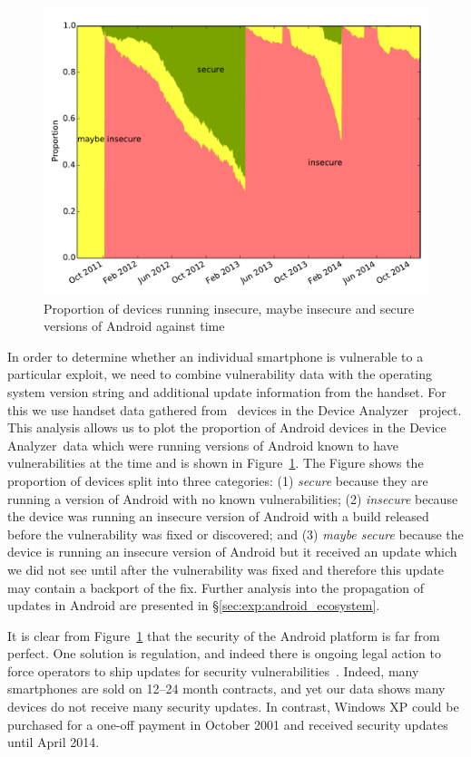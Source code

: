 \documentclass[conference,a4paper,twoside]{IEEEtran}
\let\OldTodo\todo
\renewcommand{\todo}{\OldTodo[inline]}
\newcommand{\todolater}[1]{}%
\newcommand{\da}{Device Analyzer}
\begin{document}
\begin{figure}[h]
\centering
\includegraphics[width=\columnwidth]{figures/proportioninsecure}
\caption{Proportion of devices running insecure, maybe insecure and secure versions of Android against time}
\label{fig:proportioninsecure}
\end{figure}

In order to determine whether an individual smartphone is vulnerable to a particular exploit, we need to combine vulnerability data with the operating system version string and additional update information from the handset. 
For this we use handset data gathered from \daNumOSDevices\ devices in the \da~\cite{Wagner2013} project.
This analysis allows us to plot the proportion of Android devices in the \da\ data which were running versions of Android known to have vulnerabilities at the time and is shown in Figure~\ref{fig:proportioninsecure}.
The Figure shows the proportion of devices split into three categories: 
(1) \emph{secure} because they are running a version of Android with no known vulnerabilities; 
(2) \emph{insecure} because the device was running an insecure version of Android with a build released before the vulnerability was fixed or discovered; and 
(3) \emph{maybe secure} because the device is running an insecure version of Android but it received an update which we did not see until after the vulnerability was fixed and therefore this update may contain a backport of the fix.
Further analysis into the propagation of updates in Android are presented in \S\ref{sec:exp:android_ecosystem}.

It is clear from Figure~\ref{fig:proportioninsecure} that the security of the Android platform is far from perfect.
One solution is regulation, and indeed there is ongoing legal action to force operators to ship updates for security vulnerabilities~\cite{Soghoian2013}.\todolater{Check on the status of this legal action}
Indeed, many smartphones are sold on 12--24 month contracts, and yet our data shows many devices do not receive many security updates. 
In contrast, Windows XP could be purchased for a one-off payment in October 2001 and received security updates until April 2014.
\end{document}
